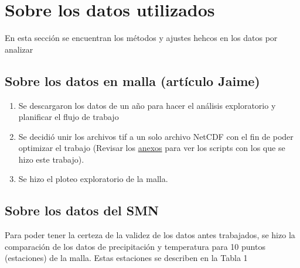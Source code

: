 \documentclass[
  11pt,
  letterpaper,
  DIV=11,
  numbers=noendperiod]{scrartcl}
\providecommand{\tightlist}{%
  \setlength{\itemsep}{0pt}\setlength{\parskip}{0pt}}
\begin{document}
\section{Sobre los datos utilizados}\label{sobre-los-datos-utilizados}

\begin{tcolorbox}[enhanced jigsaw, colback=white, coltitle=black, leftrule=.75mm, rightrule=.15mm, breakable, left=2mm, toptitle=1mm, opacityback=0, colframe=quarto-callout-important-color-frame, colbacktitle=quarto-callout-important-color!10!white, bottomtitle=1mm, title=\textcolor{quarto-callout-important-color}{\faExclamation}\hspace{0.5em}{Descripción de la sección}, toprule=.15mm, arc=.35mm, bottomrule=.15mm, titlerule=0mm, opacitybacktitle=0.6]

En esta sección se encuentran los métodos y ajustes hehcos en los datos
por analizar

\end{tcolorbox}

\subsection{Sobre los datos en malla (artículo
Jaime)}\label{sobre-los-datos-en-malla-artuxedculo-jaime}

\begin{enumerate}
\def\labelenumi{\arabic{enumi}.}
\tightlist
\item
  Se descargaron los datos de un año para hacer el análisis exploratorio
  y planificar el flujo de trabajo
\item
  Se decidió unir los archivos tif a un solo archivo NetCDF con el fin
  de poder optimizar el trabajo (Revisar los
  \hyperref[scripts-de-trabajo-con-mallas-nc-y-tif]{anexos} para ver los
  scripts con los que se hizo este trabajo).
\item
  Se hizo el ploteo exploratorio de la malla.
\end{enumerate}

\subsection{Sobre los datos del SMN}\label{sobre-los-datos-del-smn}

Para poder tener la certeza de la validez de los datos antes trabajados,
se hizo la comparación de los datos de precipitación y temperatura para
10 puntos (estaciones) de la malla. Estas estaciones se describen en la
Tabla 1
\end{document}
